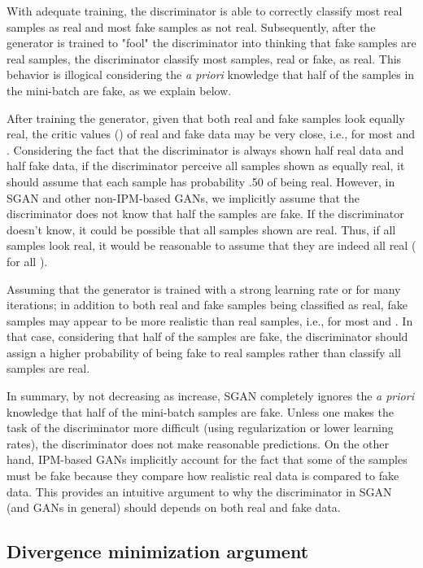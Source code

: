 \documentclass{article}
\begin{document}
With adequate training, the discriminator is able to correctly classify most real samples as real and most fake samples as not real. Subsequently, after the generator is trained to "fool" the discriminator into thinking that fake samples are real samples, the discriminator classify most samples, real or fake, as real. This behavior is illogical considering the \textit{a priori} knowledge that half of the samples in the mini-batch are fake, as we explain below. 

After training the generator, given that both real and fake samples look equally real, the critic values () of real and fake data may be very close, i.e.,  for most  and . Considering the fact that the discriminator is always shown half real data and half fake data, if the discriminator perceive all samples shown as equally real, it should assume that each sample has probability .50 of being real. However, in SGAN and other non-IPM-based GANs, we implicitly assume that the discriminator does not know that half the samples are fake. If the discriminator doesn't know, it could be possible that all samples shown are real. Thus, if all samples look real, it would be reasonable to assume that they are indeed all real ( for all ).

Assuming that the generator is trained with a strong learning rate or for many iterations; in addition to both real and fake samples being classified as real, fake samples may appear to be more realistic than real samples, i.e.,  for most  and . In that case, considering that half of the samples are fake, the discriminator should assign a higher probability of being fake to real samples rather than classify all samples are real.

In summary, by not decreasing  as  increase, SGAN completely ignores the \textit{a priori} knowledge that half of the mini-batch samples are fake. Unless one makes the task of the discriminator more difficult (using regularization or lower learning rates), the discriminator does not make reasonable predictions. On the other hand, IPM-based GANs implicitly account for the fact that some of the samples must be fake because they compare how realistic real data is compared to fake data. This provides an intuitive argument to why the discriminator in SGAN (and GANs in general) should depends on both real and fake data.

\subsection{Divergence minimization argument}
\end{document}
